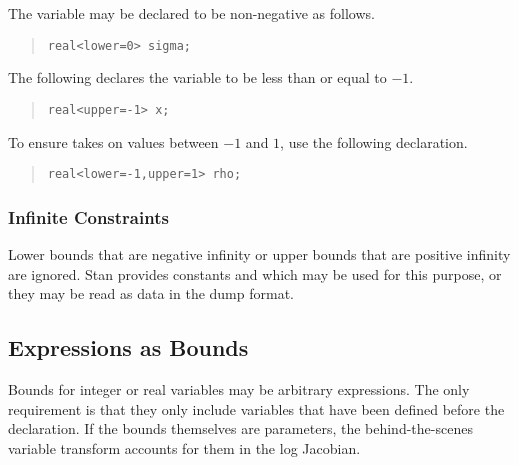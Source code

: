The variable  may be declared to be non-negative as follows.
%
\begin{quote}
\begin{Verbatim}[fontsize=\small]
real<lower=0> sigma;
\end{Verbatim}
\end{quote}
%
The following declares the variable  to be less than or equal
to $-1$.
%
\begin{quote}
\begin{Verbatim} 
real<upper=-1> x;
\end{Verbatim}
\end{quote}
% 
To ensure  takes on values between $-1$ and $1$, use the
following declaration.
%
\begin{quote}
\begin{Verbatim}[fontsize=\small]
real<lower=-1,upper=1> rho;
\end{Verbatim}
\end{quote}
%

\subsubsection{Infinite Constraints}

Lower bounds that are negative infinity or upper bounds that are
positive infinity are ignored.  Stan provides constants
 and  which may
be used for this purpose, or they may be read as data in the dump
format.  


\subsection{Expressions as Bounds}

Bounds for integer or real variables may be arbitrary expressions.
The only requirement is that they only include variables that have
been defined before the declaration.  If the bounds themselves are
parameters, the behind-the-scenes variable transform accounts for them
in the log Jacobian.  

